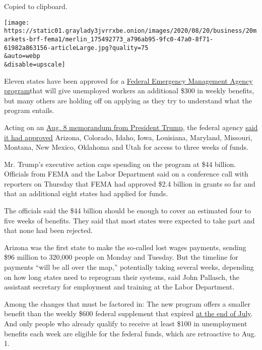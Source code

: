 Copied to clipboard.

\texttt{[image: https://static01.graylady3jvrrxbe.onion/images/2020/08/20/business/20markets-brf-fema1/merlin\_175492773\_a796ab95-9fc0-47a0-8f71-61982a863156-articleLarge.jpg?quality=75\\\&auto=webp\\\&disable=upscale]}

Eleven states have been approved for a
\href{https://www.nytimes3xbfgragh.onion/2020/08/13/business/economy/unemployment-benefits-coronavirus.html}{Federal
Emergency Management Agency program}that will give unemployed workers an
additional \$300 in weekly benefits, but many others are holding off on
applying as they try to understand what the program entails.

Acting on an
\href{https://www.whitehouse.gov/presidential-actions/memorandum-authorizing-needs-assistance-program-major-disaster-declarations-related-coronavirus-disease-2019/}{Aug.
8 memorandum from President Trump}, the federal agency
\href{https://www.fema.gov/press-release/20200819/fema-announces-lost-wages-grant-maryland}{said
it had approved} Arizona, Colorado, Idaho, Iowa, Louisiana, Maryland,
Missouri, Montana, New Mexico, Oklahoma and Utah for access to three
weeks of funds.

Mr. Trump's executive action caps spending on the program at \$44
billion. Officials from FEMA and the Labor Department said on a
conference call with reporters on Thursday that FEMA had approved \$2.4
billion in grants so far and that an additional eight states had applied
for funds.

The officials said the \$44 billion should be enough to cover an
estimated four to five weeks of benefits. They said that most states
were expected to take part and that none had been rejected.

Arizona was the first state to make the so-called lost wages payments,
sending \$96 million to 320,000 people on Monday and Tuesday. But the
timeline for payments ``will be all over the map,'' potentially taking
several weeks, depending on how long states need to reprogram their
systems, said John Pallasch, the assistant secretary for employment and
training at the Labor Department.

Among the changes that must be factored in: The new program offers a
smaller benefit than the weekly \$600 federal supplement that expired
\href{https://www.nytimes3xbfgragh.onion/2020/08/08/business/economy/lost-unemployment-benefits.html?action=click\&module=RelatedLinks\&pgtype=Article}{at
the end of July}. And only people who already qualify to receive at
least \$100 in unemployment benefits each week are eligible for the
federal funds, which are retroactive to Aug. 1.

